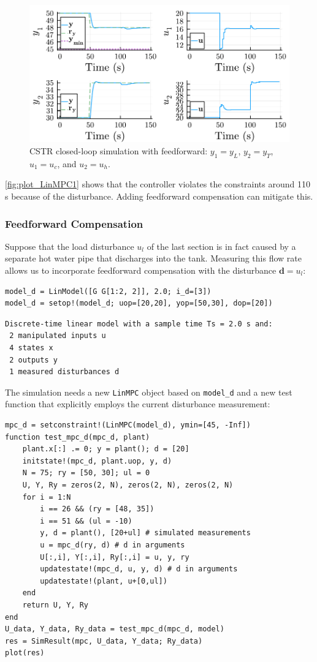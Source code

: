 \begin{figure}[ht]
    \centering
    \includegraphics[width=\columnwidth]{fig/plot_LinMPC2.pdf}
    \caption{CSTR closed-loop simulation with feedforward: $y_1=y_L$, $y_2=y_T$, $u_1=u_c$, and $u_2=u_h$.}
    \label{fig:plot_LinMPC2}
\end{figure}

\cref{fig:plot_LinMPC1} shows that the controller violates the constraints around 110 s because of the disturbance. Adding feedforward compensation can mitigate this.

\subsubsection{Feedforward Compensation}

Suppose that the load disturbance $u_l$ of the last section is in fact caused by a separate hot water pipe that discharges into the tank. Measuring this flow rate allows us to incorporate feedforward compensation with the disturbance $\mathbf{d}=u_l$:

\begin{verbatim}
model_d = LinModel([G G[1:2, 2]], 2.0; i_d=[3])
model_d = setop!(model_d; uop=[20,20], yop=[50,30], dop=[20])
\end{verbatim}
\spacerepl
\begin{verbatim}
Discrete-time linear model with a sample time Ts = 2.0 s and:
 2 manipulated inputs u
 4 states x
 2 outputs y
 1 measured disturbances d
\end{verbatim}
The simulation needs a new \texttt{LinMPC} object based on \texttt{model\_d} and a new test function that explicitly employs the current disturbance measurement:
\begin{verbatim}
mpc_d = setconstraint!(LinMPC(model_d), ymin=[45, -Inf])
function test_mpc_d(mpc_d, plant)
    plant.x[:] .= 0; y = plant(); d = [20]
    initstate!(mpc_d, plant.uop, y, d)
    N = 75; ry = [50, 30]; ul = 0
    U, Y, Ry = zeros(2, N), zeros(2, N), zeros(2, N)
    for i = 1:N
        i == 26 && (ry = [48, 35])
        i == 51 && (ul = -10)
        y, d = plant(), [20+ul] # simulated measurements
        u = mpc_d(ry, d) # d in arguments
        U[:,i], Y[:,i], Ry[:,i] = u, y, ry
        updatestate!(mpc_d, u, y, d) # d in arguments
        updatestate!(plant, u+[0,ul])
    end
    return U, Y, Ry
end
U_data, Y_data, Ry_data = test_mpc_d(mpc_d, model)
res = SimResult(mpc, U_data, Y_data; Ry_data)
plot(res)
\end{verbatim}

